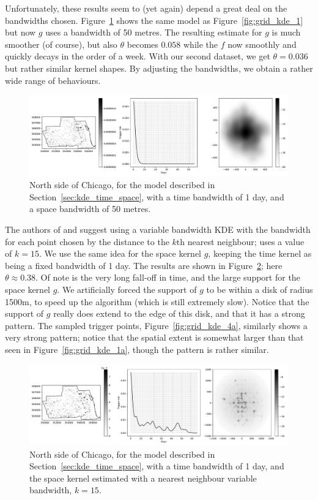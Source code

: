 \documentclass[twoside,a4paper]{article}
\theoremstyle{plain}
\theoremstyle{definition}
\begin{document}
Unfortunately, these results seem to (yet again) depend a great deal on the bandwidths chosen.
Figure~\ref{fig:grid_kde_3} shows the same model as Figure~\ref{fig:grid_kde_1} but now $g$ uses
a bandwidth of 50 metres.  The resulting estimate for $g$ is much smoother (of course), but also
$\theta$ becomes $0.058$ while the $f$ now smoothly and quickly decays in the order of a week.
With our second dataset, we get $\theta=0.036$ but rather similar kernel shapes.  By adjusting
the bandwidths, we obtain a rather wide range of behaviours.

\begin{figure}
  \includegraphics[width=\textwidth]{../notebooks/grid_kde_three.pdf}
  \caption{North side of Chicago, for the model described in Section~\ref{sec:kde_time_space},
  with a time bandwidth of 1 day, and a space bandwidth of 50 metres.}
  \label{fig:grid_kde_3}
\end{figure}

The authors of \cite{sepp} and \cite{zovj} suggest using a variable bandwidth KDE with the
bandwidth for each point chosen by the distance to the $k$th nearest neighbour; \cite{sepp}
uses a value of $k=15$.  We use the same idea for the space kernel $g$, keeping the time
kernel as being a fixed bandwidth of 1 day.  The results are shown in Figure~\ref{fig:grid_kde_4};
here $\theta \approx 0.38$.  Of note is the very long fall-off in time, and the large support for
the space kernel $g$.  We artificially forced the support of $g$ to be within a disk of radius
1500m, to speed up the algorithm (which is still extremely slow).  Notice that the support of
$g$ really does extend to the edge of this disk, and that it has a strong pattern.  The sampled
trigger points, Figure~\ref{fig:grid_kde_4a}, similarly shows a very strong pattern; notice
that the spatial extent is somewhat larger than that seen in Figure~\ref{fig:grid_kde_1a},
though the pattern is rather similar.

\begin{figure}
  \includegraphics[width=\textwidth]{../notebooks/grid_kde_knn1.pdf}
  \caption{North side of Chicago, for the model described in Section~\ref{sec:kde_time_space},
  with a time bandwidth of 1 day, and the space kernel estimated with a nearest neighbour variable
  bandwidth, $k=15$.}
  \label{fig:grid_kde_4}
\end{figure}
\end{document}
